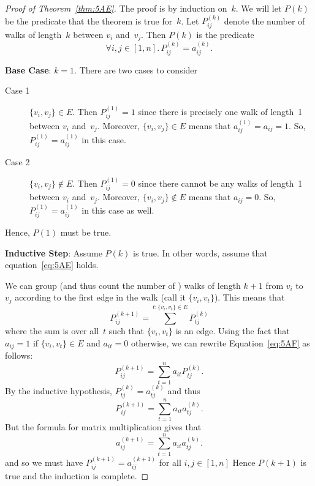 \begin{proof}[Proof of Theorem~\ref{thm:5AE}]
The proof is by induction on~$k$.  We will let $P(k)$ be the predicate
that the theorem is true for~$k$.  Let $P_{ij}^{(k)}$ denote the
number of walks of length~$k$ between $v_i$ and~$v_j$.  Then $P(k)$ is
the predicate
\begin{equation}\label{eq:5AE}
    \forall i, j \in [1, n].\, P_{ij}^{(k)} = a_{ij}^{(k)}.
\end{equation}

\textbf{Base Case}:  $k = 1$.  There are two cases to consider
\begin{description}

\item[Case 1]

$\{ v_i, v_j \} \in E$.  Then $P_{ij}^{(1)} = 1$ since there is
  precisely one walk of length~1 between $v_i$ and~$v_j$.  Moreover,
  $\{ v_i, v_j \} \in E$ means that $a_{ij}^{(1)} = a_{ij} = 1$.  So,
  $P_{ij}^{(1)} = a_{ij}^{(1)}$ in this case.

\item[Case 2]

$\{ v_i, v_j \} \notin E$.  Then $P_{ij}^{(1)} = 0$ since there
  cannot be any walks of length~1 between $v_i$ and~$v_j$.  Moreover,
  $\{ v_i, v_j \} \notin E$ means that $a_{ij} = 0$.  So,
  $P_{ij}^{(1)} = a_{ij}^{(1)}$ in this case as well.

\end{description}

Hence, $P(1)$ must be true.

\textbf{Inductive Step}:
Assume $P(k)$ is true.  In other words, assume that
equation~\ref{eq:5AE} holds.

We can group (and thus count the number of ) walks of length $k+1$
from $v_i$ to~$v_j$ according to the first edge in the walk (call it
$\{ v_i, v_t \}$).  This means that
\begin{equation}\label{eq:5AF}
    P_{ij}^{(k + 1)} = \sum^{t: \{ v_i, v_t \} \in E} P_{tj}^{(k)}
\end{equation}
where the sum is over all~$t$ such that $\{ v_i, v_t \}$ is an edge.
Using the fact that $a_{ij} = 1$ if $\{ v_i, v_t \} \in E$ and $a_{it}
= 0$ otherwise, we can rewrite Equation~\ref{eq:5AF} as follows:
\begin{equation*}
    P_{ij}^{(k + 1)} = \sum_{t = 1}^{n} a_{it} P_{tj}^{(k)}.
\end{equation*}
By the inductive hypothesis, $P_{tj}^{(k)} = a_{tj}^{(k)}$ and thus
\begin{equation*}
    P_{ij}^{(k + 1)} = \sum_{t = 1}^{n} a_{it} a_{tj}^{(k)}.
\end{equation*}
But the formula for matrix multiplication gives that
\begin{equation*}
    a_{ij}^{(k + 1)} = \sum_{t = 1}^{n} a_{it} a_{tj}^{(k)}.
\end{equation*}
and so we must have $P_{ij}^{(k+1)} = a_{ij}^{(k+1)}$ for all $i, j
\in [1, n]$  Hence $P(k+1)$ is true and the induction is complete.
\end{proof}

